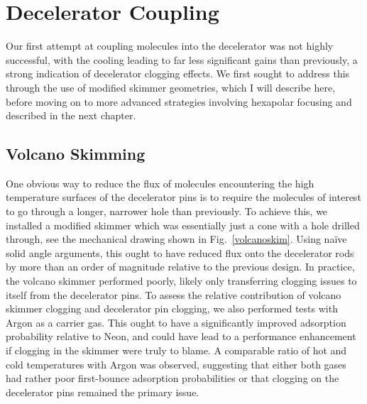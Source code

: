 
\section{Decelerator Coupling}

Our first attempt at coupling molecules into the decelerator was not highly successful, with the cooling leading to far less significant gains than previously, a strong indication of decelerator clogging effects.
We first sought to address this through the use of modified skimmer geometries, which I will describe here, before moving on to more advanced strategies involving hexapolar focusing and described in the next chapter.

\subsection{Volcano Skimming}


One obvious way to reduce the flux of molecules encountering the high temperature surfaces of the decelerator pins is to require the molecules of interest to go through a longer, narrower hole than previously.
To achieve this, we installed a modified skimmer which was essentially just a cone with a hole drilled through, see the mechanical drawing shown in Fig.~\ref{volcanoskim}.
Using na\"{i}ve solid angle arguments, this ought to have reduced flux onto the decelerator rods by more than an order of magnitude relative to the previous design.
In practice, the volcano skimmer performed poorly, likely only transferring clogging issues to itself from the decelerator pins.
To assess the relative contribution of volcano skimmer clogging and decelerator pin clogging, we also performed tests with Argon as a carrier gas.
This ought to have a significantly improved adsorption probability relative to Neon, and could have lead to a performance enhancement if clogging in the skimmer were truly to blame.
A comparable ratio of hot and cold temperatures with Argon was observed, suggesting that either both gases had rather poor first-bounce adsorption probabilities or that clogging on the decelerator pins remained the primary issue.

